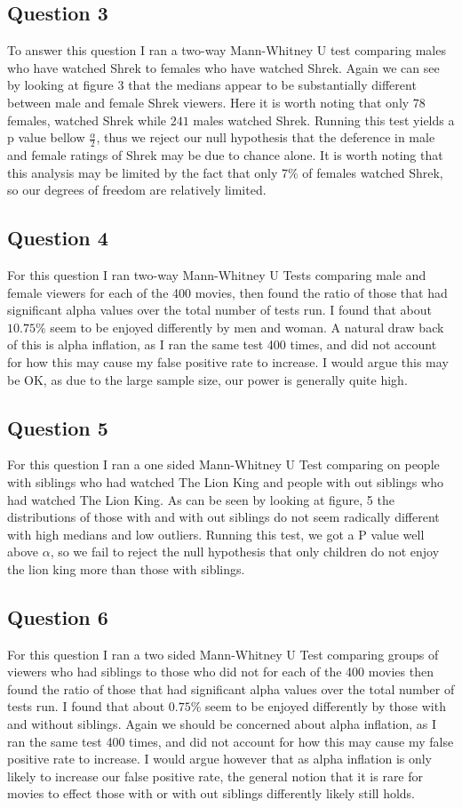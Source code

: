 \documentclass{article}
\begin{document}
\subsection*{Question 3}
To answer this question I ran a two-way Mann-Whitney U test comparing males who have watched Shrek to females who have watched Shrek. Again we can see by looking at figure 3 that the medians appear to be substantially different between male and female Shrek viewers. Here it is worth noting that only $78$ females, watched Shrek while $241$ males watched Shrek. Running this test yields a p value bellow $\frac{\alpha}{2}$, thus we reject our null hypothesis that the deference in male and female ratings of Shrek may be due to chance alone. It is worth noting that this analysis may be limited by the fact that only 7$\%$ of females watched Shrek, so our degrees of freedom are relatively limited. 
\subsection*{Question 4}
For this question I ran two-way Mann-Whitney U Tests comparing male and female viewers for each of the 400 movies, then found the ratio of those that had significant alpha values over the total number of tests run. I found that about $10.75\% $ seem to be enjoyed differently by men and woman. A natural draw back of this is alpha inflation, as I ran the same test 400 times, and did not account for how this may cause my false positive rate to increase. I would argue this may be OK, as due to the large sample size, our power is generally quite high.


\subsection*{Question 5}
For this question I ran a one sided Mann-Whitney U Test comparing on people with siblings who had watched The Lion King and people with out siblings who had watched The Lion King. As can be seen by looking at figure, 5 the distributions of those with and with out siblings do not seem radically different with high medians and low outliers. Running this test, we got a P value well above $\alpha$, so we fail to reject the null hypothesis that only children do not enjoy the lion king more than those with siblings.
\subsection*{Question 6}
For this question I ran a two sided Mann-Whitney U Test comparing groups of viewers who had siblings to those who did not for each of the 400 movies then found the ratio of those that had significant alpha values over the total number of tests run. I found that about $0.75\% $ seem to be enjoyed differently by those with and without siblings. Again we should be concerned about alpha inflation, as I ran the same test 400 times, and did not account for how this may cause my false positive rate to increase. I would argue however that as alpha inflation is only likely to increase our false positive rate, the general notion that it is rare for movies to effect those with or with out siblings differently likely still holds.
\end{document}
